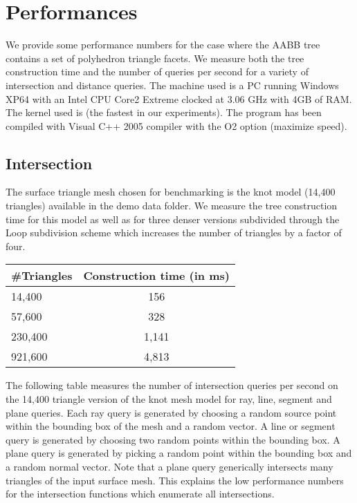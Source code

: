 \section{Performances}
\label{AABB_tree_section_performances}

We provide some performance numbers for the case where the AABB tree contains a set of polyhedron triangle facets. We measure both the tree construction time and the number of queries per second for a variety of intersection and distance queries. The machine used is a PC running Windows XP64 with an Intel CPU Core2 Extreme clocked at 3.06 GHz with 4GB of RAM. The kernel used is  (the fastest in our experiments). The program has been compiled with Visual C++ 2005 compiler with the O2 option (maximize speed).

\subsection{Intersection}

The surface triangle mesh chosen for benchmarking is the knot model (14,400 triangles) available in the demo data folder. We measure the tree construction time for this model as well as for three denser versions subdivided through the Loop subdivision scheme which increases the number of triangles by a factor of four.

\begin{tabular}{|l|c|}
  \hline
  #Triangles & Construction time (in ms)\\
  \hline
   14,400 &   156 \\
   57,600 &   328 \\
  230,400 & 1,141 \\
  921,600 & 4,813 \\
  \hline
\end{tabular}

The following table measures the number of intersection queries per second on the 14,400 triangle version of the knot mesh model for ray, line, segment and plane queries. Each ray query is generated by choosing a random source point within the bounding box of the mesh and a random vector. A line or segment query is generated by choosing two random points within the bounding box. A plane query is generated by picking a random point within the bounding box and a random normal vector. Note that a plane query generically intersects many triangles of the input surface mesh. This explains the low performance numbers for the intersection functions which enumerate all intersections.

